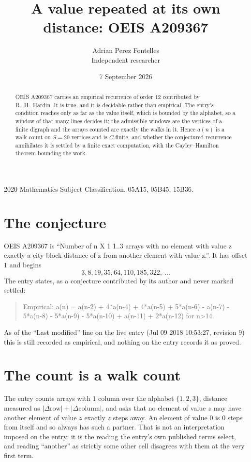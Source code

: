 \documentclass[11pt,a4paper]{article}
\title{A value repeated at its own distance: OEIS A209367}
\author{Adrian Perez Fontelles\\ \small Independent researcher}
\date{7 September 2026}
\theoremstyle{plain}
\theoremstyle{definition}
\begin{document}
\maketitle

\begin{abstract}
OEIS A209367 carries an empirical recurrence of order $12$ contributed by R.~H.~Hardin. It is
true, and it is decidable rather than empirical. The entry's condition reaches only as far as the value itself, which is bounded by the
alphabet, so a window of that many lines decides it; the
admissible windows are the vertices of a finite digraph and the arrays counted are exactly the
walks in it. Hence $a(n)$ is a walk count on $S=20$ vertices and is $C$-finite, and whether the
conjectured recurrence annihilates it is settled by a finite exact computation, with the
Cayley--Hamilton theorem bounding the work.
\end{abstract}

\noindent\small 2020 Mathematics Subject Classification. 05A15, 05B45, 15B36.\normalsize

\section{The conjecture}

OEIS A209367 is ``Number of n X 1 1..3 arrays with no element with value z exactly a city block distance of z from another element with value z.''. It has offset $1$ and begins
\[
3, 8, 19, 35, 64, 110, 185, 322,\ \dots
\]
The entry states, as a conjecture contributed by its author and never marked settled:
\begin{quote}
Empirical: a(n) = a(n-2) + 4*a(n-4) + 4*a(n-5) + 5*a(n-6) - a(n-7) - 5*a(n-8) - 5*a(n-9) - 5*a(n-10) + a(n-11) + 2*a(n-12) for n>14.
\end{quote}
As of the ``Last modified'' line on the live entry (Jul 09 2018 10:53:27, revision 9) this is still
recorded as empirical, and nothing on the entry records it as proved.

\section{The count is a walk count}

The entry counts arrays with $1$ column over the alphabet $\{1,2,3\}$, distance measured as $|\Delta \text{row}|+|\Delta \text{column}|$, and asks that no element of value $z$ may have another element of value $z$ exactly $z$ steps away. An element of value $0$ is $0$ steps from itself and so always has such a partner. That is not an interpretation imposed on the entry: it is the reading the entry's own published terms select, and reading ``another'' as strictly some other cell disagrees with them at the very first term.
\end{document}
